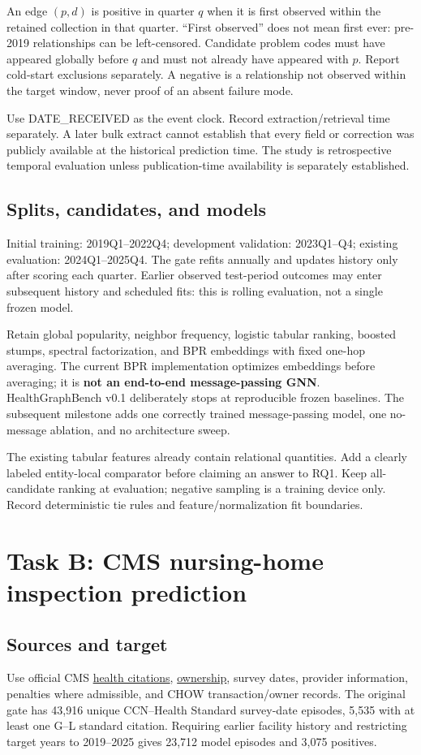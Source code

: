 \documentclass[11pt,a4paper]{article}
\begin{document}
An edge $(p,d)$ is positive in quarter $q$ when it is first observed within the retained collection in that quarter. ``First observed'' does not mean first ever: pre-2019 relationships can be left-censored. Candidate problem codes must have appeared globally before $q$ and must not already have appeared with $p$. Report cold-start exclusions separately. A negative is a relationship not observed within the target window, never proof of an absent failure mode.

Use DATE\_RECEIVED as the event clock. Record extraction/retrieval time separately. A later bulk extract cannot establish that every field or correction was publicly available at the historical prediction time. The study is retrospective temporal evaluation unless publication-time availability is separately established.

\subsection{Splits, candidates, and models}
Initial training: 2019Q1--2022Q4; development validation: 2023Q1--Q4; existing evaluation: 2024Q1--2025Q4. The gate refits annually and updates history only after scoring each quarter. Earlier observed test-period outcomes may enter subsequent history and scheduled fits: this is rolling evaluation, not a single frozen model.

Retain global popularity, neighbor frequency, logistic tabular ranking, boosted stumps, spectral factorization, and BPR embeddings with fixed one-hop averaging. The current BPR implementation optimizes embeddings before averaging; it is \textbf{not an end-to-end message-passing GNN}. HealthGraphBench v0.1 deliberately stops at reproducible frozen baselines. The subsequent milestone adds one correctly trained message-passing model, one no-message ablation, and no architecture sweep.

The existing tabular features already contain relational quantities. Add a clearly labeled entity-local comparator before claiming an answer to RQ1. Keep all-candidate ranking at evaluation; negative sampling is a training device only. Record deterministic tie rules and feature/normalization fit boundaries.

\section{Task B: CMS nursing-home inspection prediction}
\subsection{Sources and target}
Use official CMS \href{https://data.cms.gov/provider-data/dataset/r5ix-sfxw}{health citations}, \href{https://data.cms.gov/provider-data/dataset/y2hd-n93e}{ownership}, survey dates, provider information, penalties where admissible, and CHOW transaction/owner records. The original gate has 43,916 unique CCN--Health Standard survey-date episodes, 5,535 with at least one G--L standard citation. Requiring earlier facility history and restricting target years to 2019--2025 gives 23,712 model episodes and 3,075 positives.
\end{document}

